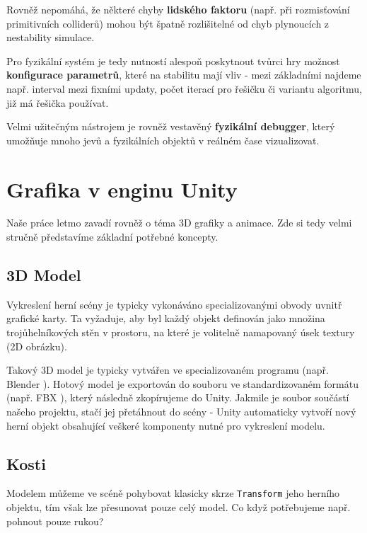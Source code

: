 Rovněž nepomáhá, že některé chyby \textbf{lidského faktoru} (např. při rozmisťování primitivních colliderů) mohou být špatně rozlišitelné od chyb plynoucích z nestability simulace. 

Pro fyzikální systém je tedy nutností alespoň poskytnout tvůrci hry možnost \textbf{konfigurace parametrů}, které na stabilitu mají vliv - mezi základními najdeme např. interval mezi fixními updaty, počet iterací pro řešičku či variantu algoritmu, již má řešička používat.

Velmi užitečným nástrojem je rovněž vestavěný \textbf{fyzikální debugger}, který umožňuje mnoho jevů a fyzikálních objektů v reálném čase vizualizovat.





\section{Grafika v enginu Unity}

Naše práce letmo zavadí rovněž o téma 3D grafiky a animace. Zde si tedy velmi stručně představíme základní potřebné koncepty. 

\subsection{3D Model}

Vykreslení herní scény je typicky vykonáváno specializovanými obvody uvnitř grafické karty. Ta vyžaduje, aby byl každý objekt definován jako množina trojůhelníkových stěn v prostoru, na které je volitelně namapovaný úsek textury (2D obrázku).

Takový 3D model je typicky vytvářen ve specializovaném programu (např. Blender \cite{Blender}). Hotový model je exportován do souboru ve standardizovaném formátu (např. FBX \cite{FBXFormat}), který následně zkopírujeme do Unity. Jakmile je soubor součástí našeho projektu, stačí jej přetáhnout do scény - Unity automaticky vytvoří nový herní objekt obsahující veškeré komponenty nutné pro vykreslení modelu.

\subsection{Kosti}

Modelem můžeme ve scéně pohybovat klasicky skrze \texttt{Transform} jeho herního objektu, tím však lze přesunovat pouze celý model. Co když potřebujeme např. pohnout pouze rukou?

